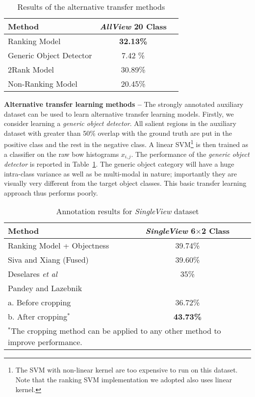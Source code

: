 \documentclass{bmvc2k}
\def\etal{\emph{et al}\bmvaOneDot}
\def\bow{{{\sc b}o{\sc w} }}
\begin{document}
\begin{table}[ht]
\begin{center}
\begin{tabular}{l c c}
\hline
\textbf{Method} & \textbf{\emph{AllView} 20 Class} \\
\hline
Ranking Model & \textbf{32.13\%} \\
Generic Object Detector & 7.42 \%  \\
\hline
\hline
2Rank Model  & 30.89\% \\
Non-Ranking Model  & 20.45\% \\
\hline
\end{tabular}
\end{center}

\caption{Results of the alternative transfer methods}
\label{results_alternative}
\end{table}
\noindent\textbf{Alternative transfer learning methods --}
The strongly annotated auxiliary dataset can be used to learn alternative transfer learning models. Firstly, we consider learning a \textit{generic object detector}. All salient regions in the auxiliary dataset with greater than 50\% overlap with the ground truth are put in the positive class and the rest  in the negative class.  A linear SVM\footnote[1]{\scriptsize The SVM with non-linear kernel are too expensive to run on this dataset. Note that the ranking SVM implementation we adopted also uses linear kernel.} is then trained as a classifier on the raw \bow histograms $x_{i,j}$. The performance of the \textit{generic object detector} is reported in Table~\ref{results_alternative}. The generic object category will have a huge intra-class variance as well as be multi-modal in nature; importantly they are visually very different from the target object classes.  This basic transfer learning approach thus performs poorly.

\begin{table}[ht]
\begin{center}
\begin{tabular}{l c c}
\hline
\textbf{Method} & \textbf{\emph{SingleView} 6$\times$2 Class} \\
\hline
Ranking Model + Objectness & 39.74\% \\
Siva and Xiang (Fused) \cite{Sivaiccv2011}& 39.60\%  \\
\hline
Deselares \etal \cite{Deselaerslocalizing2010} & 35\% \\
\hline
Pandey and Lazebnik \cite{Pandeyiccv2011} \\
a. Before cropping  & 36.72\%\\
b. After cropping$^{*}$  & \textbf{43.73\%} \\
\hline
\multicolumn{2}{l}{{\scriptsize$^{*}$The cropping method can be applied to any other method to improve performance.}}
\end{tabular}
\end{center}

\caption{Annotation results for \emph{SingleView} dataset}
\label{results_singleview}
\end{table}
\end{document}
